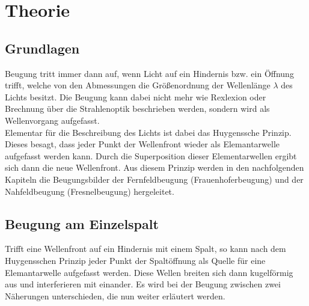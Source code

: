 \section{Theorie}
\label{sec:Theorie}
\subsection{Grundlagen}
\label{sec:grundlagen}
Beugung tritt immer dann auf, wenn Licht auf ein Hindernis bzw. ein Öffnung trifft, welche von den Abmessungen die Größenordnung der Wellenlänge $\lambda$ des Lichts
besitzt. Die Beugung kann dabei nicht mehr wie Rexlexion oder Brechnung über die Strahlenoptik beschrieben werden, sondern wird als Wellenvorgang
aufgefasst.
\\\noindent
Elementar für die Beschreibung des Lichts ist dabei das Huygenssche Prinzip. Dieses besagt, dass jeder Punkt der Wellenfront wieder als Elemantarwelle
aufgefasst werden kann. Durch die Superposition dieser Elementarwellen ergibt sich dann die neue Wellenfront. Aus diesem Prinzip werden in den nachfolgenden
Kapiteln die Beugungsbilder der Fernfeldbeugung (Frauenhoferbeugung) und der Nahfeldbeugung (Fresnelbeugung) hergeleitet. 

\subsection{Beugung am Einzelspalt}
\label{sec:einzel}
Trifft eine Wellenfront auf ein Hindernis mit einem Spalt, so kann nach dem Huygensschen Prinzip jeder Punkt der Spaltöffnung als Quelle für eine Elemantarwelle
aufgefasst werden. Diese Wellen breiten sich dann kugelförmig aus und interferieren mit einander. Es wird bei der Beugung zwischen zwei Näherungen unterschieden, 
die nun weiter erläutert werden.


